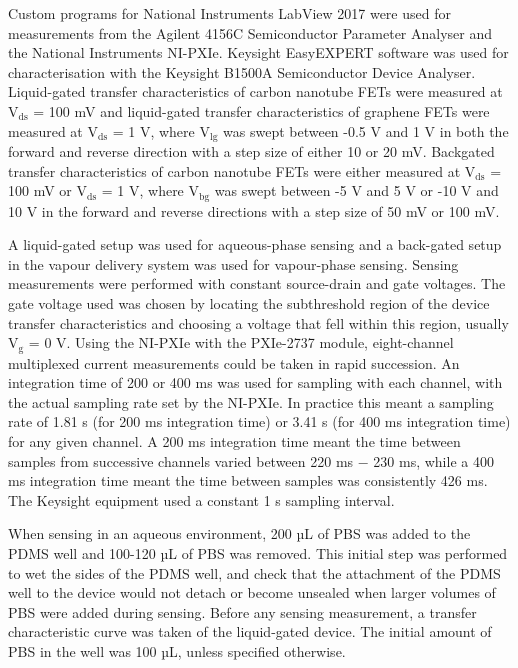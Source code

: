 \documentclass[
  a4paper,
]{scrbook}
\begin{document}
Custom programs for National Instruments LabView 2017 were used for
measurements from the Agilent 4156C Semiconductor Parameter Analyser and
the National Instruments NI-PXIe. Keysight EasyEXPERT software was used
for characterisation with the Keysight B1500A Semiconductor Device
Analyser. Liquid-gated transfer characteristics of carbon nanotube FETs
were measured at V\(_{\mathrm{ds}}\) = 100 mV and liquid-gated transfer
characteristics of graphene FETs were measured at V\(_{\mathrm{ds}}\) =
1 V, where V\(_{\mathrm{lg}}\) was swept between -0.5 V and 1 V in both
the forward and reverse direction with a step size of either 10 or 20
mV. Backgated transfer characteristics of carbon nanotube FETs were
either measured at V\(_{\mathrm{ds}}\) = 100 mV or V\(_{\mathrm{ds}}\) =
1 V, where V\(_{\mathrm{bg}}\) was swept between -5 V and 5 V or -10 V
and 10 V in the forward and reverse directions with a step size of 50 mV
or 100 mV.

A liquid-gated setup was used for aqueous-phase sensing and a back-gated
setup in the vapour delivery system was used for vapour-phase sensing.
Sensing measurements were performed with constant source-drain and gate
voltages. The gate voltage used was chosen by locating the subthreshold
region of the device transfer characteristics and choosing a voltage
that fell within this region, usually V\(_{\mathrm{g}}\) = 0 V. Using
the NI-PXIe with the PXIe-2737 module, eight-channel multiplexed current
measurements could be taken in rapid succession. An integration time of
200 or 400 ms was used for sampling with each channel, with the actual
sampling rate set by the NI-PXIe. In practice this meant a sampling rate
of 1.81 s (for 200 ms integration time) or 3.41 s (for 400 ms
integration time) for any given channel. A 200 ms integration time meant
the time between samples from successive channels varied between 220 ms
\(-\) 230 ms, while a 400 ms integration time meant the time between
samples was consistently 426 ms. The Keysight equipment used a constant
1 s sampling interval.

When sensing in an aqueous environment, 200 µL of PBS was added to the
PDMS well and 100-120 µL of PBS was removed. This initial step was
performed to wet the sides of the PDMS well, and check that the
attachment of the PDMS well to the device would not detach or become
unsealed when larger volumes of PBS were added during sensing. Before
any sensing measurement, a transfer characteristic curve was taken of
the liquid-gated device. The initial amount of PBS in the well was 100
µL, unless specified otherwise.
\end{document}
